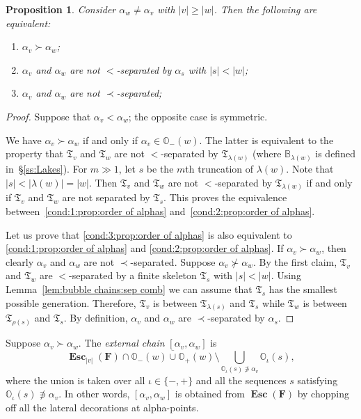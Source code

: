 \documentclass{amsart}
\newcommand{\1}{{\mathbb 1 }}
\newcommand{\skel}{{\mathfrak T}}
\newcommand{\bB}{{\mathbb{B}}}
\newcommand{\bO}{{\mathbb{O}}}
\newcommand{\bF}{{\mathbf F}}
\newtheorem{prop}[thm]{Proposition}
\theoremstyle{remark}
\numberwithin{equation}{section}
\theoremstyle{definition}
\newcommand{\Esc}{{\boldsymbol{\operatorname{Esc}}}}
\theoremstyle{nonumberbreak}
\begin{document}
  





\begin{prop}
\label{prop:order of alphas}
Consider $\alpha_w\not=\alpha_v$ with $|v|\ge |w|$. Then the following are equivalent:
\begin{enumerate}
\item ${\alpha_v\succ\alpha_w}$;\label{cond:1:prop:order of alphas}
\item $\alpha_v$ and $\alpha_w$ are not $<$-separated by $\alpha_s$ with $|s|<|w|$;\label{cond:2:prop:order of alphas}
\item $\alpha_v$ and $\alpha_w$ are not $\prec$-separated;\label{cond:3:prop:order of alphas}
\end{enumerate}
\end{prop}
\begin{proof}
Suppose that $\alpha_v< \alpha_w$; the opposite case is symmetric. 

We have ${\alpha_v\succ\alpha_w}$ if and only if $\alpha_v \in \bO_-(w)$. The latter is equivalent to the property that $\skel_v$ and $\skel_w$ are not $<$-separated by $\skel_{\lambda(w)}$ (where $\bB_{\lambda(w)}$ is defined in~\S\ref{ss:Lakes}).
For $m\gg 1$, let $s$ be the $m$th truncation of $\lambda(w)$. Note that $|s|<|\lambda(w)|=|w|$. Then $\skel_v$ and $\skel_w$ are not $<$-separated by $\skel_{\lambda(w)}$ if and only if $\skel_v$ and $\skel_w$ are not separated by $\skel_{s}$. This proves the equivalence between~\eqref{cond:1:prop:order of alphas} and~\eqref{cond:2:prop:order of alphas}.

Let us prove that \eqref{cond:3:prop:order of alphas} is also equivalent to \eqref{cond:1:prop:order of alphas} and \eqref{cond:2:prop:order of alphas}. If $\alpha_v\succ\alpha_w$, then clearly $\alpha_v$ and $\alpha_w$ are not $\prec$-separated. Suppose $\alpha_v\not \succ\alpha_w$. By the first claim, $\skel_v$ and $\skel_w$ are $<$-separated by a finite skeleton $\skel_s$ with $|s|<|w|$. Using Lemma~\ref{lem:bubble chains:sep comb} we can assume that $\skel_s$ has the smallest possible generation. Therefore, $\skel_v$ is between $\skel_{\lambda(s)}$ and $\skel_s$ while $\skel_w$ is between $\skel_{\rho(s)}$ and $\skel_s$. By definition,  $\alpha_v$ and $\alpha_w$ are $\prec$-separated by $\alpha_s$.
\end{proof}




Suppose $\alpha_v\succ\alpha_w$. The \emph{external chain} $[\alpha_v,\alpha_w]$ is \[ \Esc_{|v|}(\bF)\cap \overline{ \bO_-(w)\cup \bO_+(w)} \setminus \bigcup_{\bO_\iota(s)\not\ni \alpha_v}  \bO_\iota(s),\]
where the union is taken over all $\iota\in\{-,+\}$ and all the sequences $s$ satisfying $\bO_\iota(s)\not\ni \alpha_v$. In other words, $[\alpha_v,\alpha_w]$ is obtained from $\Esc (\bF)$ by chopping off all the lateral decorations at alpha-points.
\end{document}
